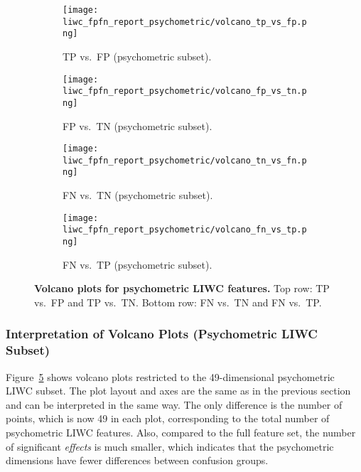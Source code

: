 \begin{figure}[H]
  \centering
  
  \begin{subfigure}[t]{0.49\textwidth}
    \centering
    \texttt{[image: liwc\_fpfn\_report\_psychometric/volcano\_tp\_vs\_fp.png]}
    \caption{TP vs.\ FP (psychometric subset).}
    \label{fig:volcano_psycho_tp_vs_fp}
  \end{subfigure}\hfill
  \begin{subfigure}[t]{0.49\textwidth}
    \centering
    \texttt{[image: liwc\_fpfn\_report\_psychometric/volcano\_fp\_vs\_tn.png]}
    \caption{FP vs.\ TN (psychometric subset).}
    \label{fig:volcano_psycho_tp_vs_tn}
  \end{subfigure}
  
  \vspace{0.5cm}
  
  \begin{subfigure}[t]{0.49\textwidth}
    \centering
    \texttt{[image: liwc\_fpfn\_report\_psychometric/volcano\_tn\_vs\_fn.png]}
    \caption{FN vs.\ TN (psychometric subset).}
    \label{fig:volcano_psycho_fn_vs_tn}
  \end{subfigure}\hfill
  \begin{subfigure}[t]{0.49\textwidth}
    \centering
    \texttt{[image: liwc\_fpfn\_report\_psychometric/volcano\_fn\_vs\_tp.png]}
    \caption{FN vs.\ TP (psychometric subset).}
    \label{fig:volcano_psycho_fn_vs_tp}
  \end{subfigure}

  \caption[Volcano plots for psychometric LIWC features.]{\textbf{Volcano plots for psychometric LIWC features.} 
  Top row: TP vs.\ FP and TP vs.\ TN. Bottom row: FN vs.\ TN and FN vs.\ TP.}
  \label{fig:volcano_psycho_features}
\end{figure}

\subsubsection{Interpretation of Volcano Plots (Psychometric LIWC Subset)}

Figure~\ref{fig:volcano_psycho_features} shows volcano plots restricted to the 49-dimensional psychometric LIWC subset. The plot layout and axes are the same as in the previous section and can be interpreted in the same way. The only difference is the number of points, which is now 49 in each plot, corresponding to the total number of psychometric LIWC features. Also, compared to the full feature set, the number of significant \textit{effects} is much smaller, which indicates that the psychometric dimensions have fewer differences between confusion groups.

